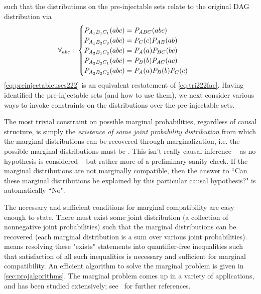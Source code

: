 such that the distributions on the pre-injectable sets relate to the original DAG distribution via
\begin{align}\label{eq:preinjectableuses222}
\begin{split}
&\forall_{a b c}:\; \begin{cases}
\pdf[A_1 B_1 C_1]{a b c} = \pdf[A B C]{a b c} \\
\pdf[A_1 B_2 C_2]{a b c} = \pdf[C]{c}\pdf[A B]{a b}\\%
\pdf[A_2 B_1 C_2]{a b c} = \pdf[A]{a}\pdf[B C]{b c}\\
\pdf[A_2 B_2 C_1]{a b c} = \pdf[B]{b}\pdf[A C]{a c}\\
\pdf[A_2 B_2 C_2]{a b c} = \pdf[A]{a}\pdf[B]{b}\pdf[C]{c}
\end{cases}\end{split}
\end{align}
\cref{eq:preinjectableuses222} is an equivalent restatement of \cref{eq:tri222fac}. Having identified the pre-injectable sets (and how to use them), we next consider various ways to invoke constraints on the distributions over the pre-injectable sets.


\label{step:marginalsproblem}

The most trivial constraint on possible marginal probabilities, regardless of causal structure,  
is simply the \emph{existence of some joint probability distribution} from which the marginal distributions can be recovered through marginalization, i.e. the possible marginal distributions must be . This isn't really causal inference -- as no hypothesis is considered -- but rather more of a preliminary sanity check. If the marginal distributions are not marginally compatible, then the answer to ``Can these marginal distributions be explained by this particular causal hypothesis?" is automatically ``No". 

The necessary and sufficient conditions for marginal compatibility are easy enough to state. There must exist some joint distribution (a collection of nonnegative joint probabilities) such that the marginal distributions can be recovered (each marginal distribution is a sum over various joint probabilities).  means resolving these "exists" statements into quantifier-free inequalities such that satisfaction of all such inequalities is necessary and sufficient for marginal compatibility. An efficient algorithm to solve the marginal problem is given in \cref{sec:projalgorithms}. The marginal problem comes up in a variety of applications, and has been studied extensively; see~\cite{fritz2013marginal} for further references.

